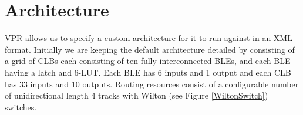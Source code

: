\documentclass[12pt,drafta4paper,oneside]{memoir} %
\begin{document}
\section{Architecture}\label{ArchFile}
\begin{figure}
    \begin{center}
    \end{center}
\end{figure}
\ac{VPR} allows us to specify a custom architecture for it to run against in an XML format. Initially we are keeping the default architecture detailed by \cite{VPRManual} consisting of a grid of \acp{CLB} each consisting of ten fully interconnected \acp{BLE}, and each \ac{BLE} having a latch and 6-\ac{LUT}.
Each \ac{BLE} has 6 inputs and 1 output and each \ac{CLB} has 33 inputs and 10 outputs.
Routing resources consist of a configurable number of unidirectional length 4 tracks with \ac{Wilton} (see Figure \ref{WiltonSwitch}) switches.
\end{document}
